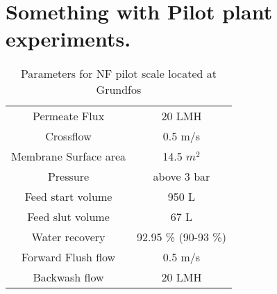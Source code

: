 \chapter{Something with Pilot plant experiments.}


\begin{table}[H]
\centering
\caption{Parameters for NF pilot scale located at Grundfos }
	\begin{tabular}{c|c}
   Permeate Flux & 20 LMH  \\ 
    Crossflow  & 0.5 m/s  \\
    Membrane Surface area & 14.5 $m^2$ \\
     Pressure  & above 3 bar  \\
     Feed start volume & 950 L  \\
    Feed slut volume  & 67 L   \\
   Water recovery & 92.95 \% (90-93 \%) \\
     Forward Flush flow &  0.5 m/s \\
     Backwash flow  & 20 LMH  \\
	\end{tabular}
	\label{Tab:NF_mega_parametre}
\end{table}